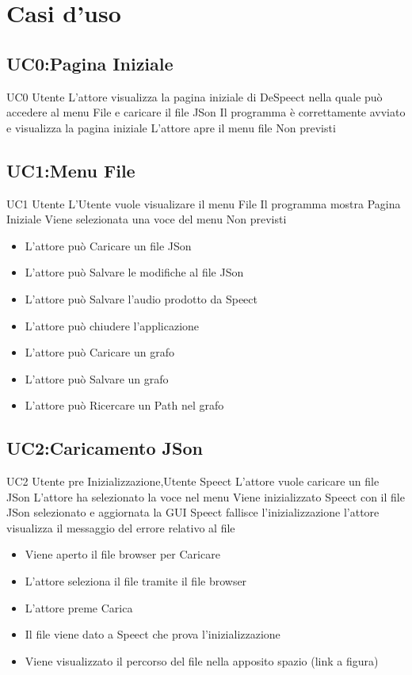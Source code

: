 \documentclass[../AnalisideiRequisiti.tex]{subfiles}
\begin{document}

	\chapter{Casi d'uso}
	\section{UC0:Pagina Iniziale}
	\UserCase
	{UC0}
	{Utente}
	{}
	{L'attore visualizza la pagina iniziale di DeSpeect nella quale può accedere al menu File e caricare il file JSon}
	{Il programma è correttamente avviato e visualizza la pagina iniziale}
	{L'attore apre il menu file}
	{Non previsti}
	{}
	
	\section{UC1:Menu File}
	\UserCase
	{UC1}
	{Utente}
	{}
	{L'Utente vuole visualizare il menu File}
	{Il programma mostra Pagina Iniziale }
	{Viene selezionata una voce del menu}
	{Non previsti}
	{	\begin{itemize}
		\item{} L'attore può Caricare un file JSon 
		\item{} L'attore può Salvare le modifiche al file JSon 
		\item{} L'attore può Salvare l'audio prodotto da Speect 
		\item{} L'attore può chiudere l'applicazione 
		\item{} L'attore può Caricare un grafo 
		\item{} L'attore può Salvare un grafo 
		\item{} L'attore può Ricercare un Path nel grafo 
		\end{itemize}
	}

	\section{UC2:Caricamento JSon}
	\UserCase
	{UC2}
	{Utente pre Inizializzazione,Utente}
	{Speect}
	{L'attore vuole caricare un file JSon}
	{L'attore ha selezionato la voce nel menu}
	{Viene inizializzato Speect con il file JSon selezionato e aggiornata la GUI}
	{Speect fallisce l'inizializzazione l'attore visualizza il messaggio del errore relativo al file }
	{
		\begin{itemize}
			\item{} Viene aperto il file browser per Caricare
			\item{} L'attore seleziona il file tramite il file browser 
			\item{} L'attore preme Carica
			\item{} Il file viene dato a Speect che prova l'inizializzazione
			\item{} Viene visualizzato il percorso del file nella apposito spazio (link a figura)
		\end{itemize}
	}
\end{document}
